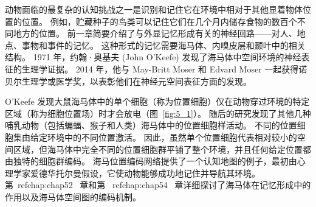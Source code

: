动物面临的最复杂的认知挑战之一是识别和记住它在环境中相对于其他显着物体位置的位置。
例如，贮藏种子的鸟类可以记住它们在几个月内储存食物的数百个不同地方的位置。
前一章简要介绍了与外显记忆形成有关的神经回路——对人、地点、事物和事件的记忆。
这种形式的记忆需要海马体、内嗅皮层和颞叶中的相关结构。
1971 年，约翰·奥基夫 (John O’Keefe) 发现了海马体中空间环境的神经表征的生理学证据。
2014 年，他与 May-Britt Moser 和 Edvard Moser 一起获得诺贝尔生理学或医学奖，以表彰他们在神经元空间表征方面的发现。


O’Keefe 发现大鼠海马体中的单个细胞（称为位置细胞）仅在动物穿过环境的特定区域（称为细胞位置场）时才会放电（图~\ref{fig:5_1}）。
随后的研究发现了其他几种哺乳动物（包括蝙蝠、猴子和人类）海马体中的位置细胞样活动。
不同的位置细胞集由给定环境中的不同位置激活。
因此，虽然单个位置细胞代表相对较小的空间区域，但海马体中完全不同的位置细胞群平铺了整个环境，并且任何给定位置都由独特的细胞群编码。
海马位置编码网络提供了一个认知地图的例子，最初由心理学家爱德华托尔曼假设，它使动物能够成功地记住并导航其环境。
第~ref{chap:chap52}~ 章和第 ~ref{chap:chap54}~ 章详细探讨了海马体在记忆形成中的作用以及海马体空间图的编码机制。


